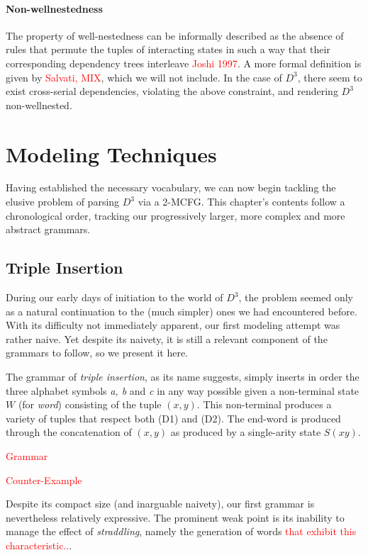 \documentclass[nonatbib,numbers,10pt]{sigplanconf}
\newcommand\todo[1]{\textcolor{red}{#1}}
\begin{document}
\paragraph{Non-wellnestedness}
The property of well-nestedness can be informally described as the absence of rules that permute the tuples of interacting states in such a way that their corresponding dependency trees interleave \todo{Joshi 1997}. A more formal definition is given by \todo{Salvati, MIX}, which we will not include. In the case of $D^3$, there seem to exist cross-serial dependencies, violating the above constraint, and rendering $D^3$ non-wellnested.

\section{Modeling Techniques}
Having established the necessary vocabulary, we can now begin tackling the elusive problem of parsing $D^3$ via a 2-MCFG. This chapter's contents follow a chronological order, tracking our progressively larger, more complex and more abstract grammars.
\subsection{Triple Insertion}
During our early days of initiation to the world of $D^3$, the problem seemed only as a natural continuation to the (much simpler) ones we had encountered before. With its difficulty not immediately apparent, our first modeling attempt was rather naive. Yet despite its naivety, it is still a relevant component of the grammars to follow, so we present it here.

The grammar of \textit{triple insertion}, as its name suggests, simply inserts in order the three alphabet symbols \textit{a, b} and \textit{c} in any way possible given a non-terminal state $W$ (for \textit{word}) consisting of the tuple $(x,y)$. This non-terminal produces a variety of tuples that respect both (D1) and (D2). The end-word is produced through the concatenation of $(x,y)$ as produced by a single-arity state $S(xy)$.

\todo{Grammar}

\todo{Counter-Example}

Despite its compact size (and inarguable naivety), our first grammar is nevertheless relatively expressive. The prominent weak point is its inability to manage the effect of \textit{straddling}, namely the generation of words \todo{that exhibit this characteristic..}.
\end{document}
